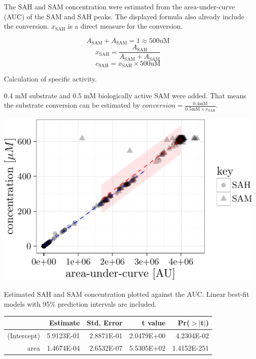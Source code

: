 \documentclass[]{tufte-handout}
\begin{document}
The SAH and SAM concentration were estimated from the area-under-curve
(AUC) of the SAM and SAH peaks. The displayed formula also already
include the conversion. \(x_\mathrm{SAH}\) is a direct measure for the
conversion.

\begin{marginfigure}
$$A_\mathrm{SAM} + A_\mathrm{SAM} = 1 \approx 500 \mathrm{uM}$$
$$x_\mathrm{SAH} = \frac{A_\mathrm{SAH}}{A_\mathrm{SAM} + A_\mathrm{SAM}}$$
$$c_\mathrm{SAH} = x_\mathrm{SAH} \times 500 \mathrm{uM}$$
\caption{Calculation of specific activity.}
\end{marginfigure}

0.4 mM substrate and 0.5 mM biologically active SAM were added. That
means the substrate conversion can be estimated by
\(conversion = \frac{0.4\mathrm{mM}}{0.5\mathrm{mM} \times x_\mathrm{SAH}}\).

\begin{marginfigure}
 \includegraphics{tufte_files/figure-latex/concentration_estimation-1.pdf}
\caption{Estimated SAH and SAM concentration plotted against the AUC. Linear best-fit models with 95\% prediction intervals are included.}
\end{marginfigure}

\begin{table}[ht]
\centering
\begin{tabular}{rrrrr}
  \toprule
 & Estimate & Std. Error & t value & Pr($>$$|$t$|$) \\ 
  \midrule
(Intercept) & 5.9123E-01 & 2.8871E-01 & 2.0479E+00 & 4.2304E-02 \\ 
  area & 1.4674E-04 & 2.6532E-07 & 5.5305E+02 & 1.4152E-251 \\ 
   \bottomrule
\end{tabular}
\end{table}
\end{document}
